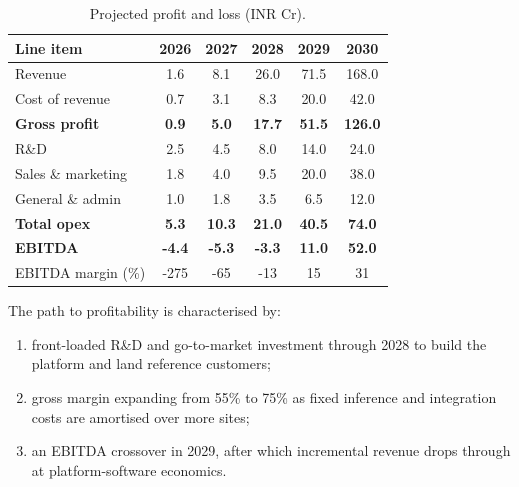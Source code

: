\documentclass[journal,article,submit,moreauthors]{Definitions/mdpi}
\begin{document}
\begin{table}[H]
	\caption{Projected profit and loss (INR Cr).}
	\label{tab:pnl}
	\begin{tabularx}{\textwidth}{lCCCCC}
		\toprule
		\textbf{Line item} & \textbf{2026} & \textbf{2027} & \textbf{2028}
		& \textbf{2029} & \textbf{2030} \\
		\midrule
		Revenue              & 1.6  & 8.1  & 26.0 & 71.5 & 168.0 \\
		Cost of revenue      & 0.7  & 3.1  & 8.3  & 20.0 & 42.0 \\
		\textbf{Gross profit} & \textbf{0.9} & \textbf{5.0} & \textbf{17.7}
		& \textbf{51.5} & \textbf{126.0} \\
		\midrule
		R\&D                 & 2.5  & 4.5  & 8.0  & 14.0 & 24.0 \\
		Sales \& marketing   & 1.8  & 4.0  & 9.5  & 20.0 & 38.0 \\
		General \& admin     & 1.0  & 1.8  & 3.5  & 6.5  & 12.0 \\
		\textbf{Total opex}  & \textbf{5.3} & \textbf{10.3} & \textbf{21.0}
		& \textbf{40.5} & \textbf{74.0} \\
		\midrule
		\textbf{EBITDA}      & \textbf{-4.4} & \textbf{-5.3} & \textbf{-3.3}
		& \textbf{11.0} & \textbf{52.0} \\
		EBITDA margin (\%)   & -275 & -65  & -13  & 15   & 31 \\
		\bottomrule
	\end{tabularx}
\end{table}

The path to profitability is characterised by:

\begin{enumerate}
	\item front-loaded R\&D and go-to-market investment through 2028 to build
	      the platform and land reference customers;
	\item gross margin expanding from 55\% to 75\% as fixed inference and
	      integration costs are amortised over more sites;
	\item an EBITDA crossover in 2029, after which incremental revenue drops
	      through at platform-software economics.
\end{enumerate}
\end{document}
